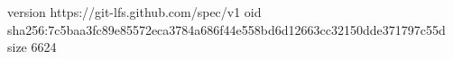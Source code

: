 version https://git-lfs.github.com/spec/v1
oid sha256:7c5baa3fc89e85572eca3784a686f44e558bd6d12663cc32150dde371797c55d
size 6624

